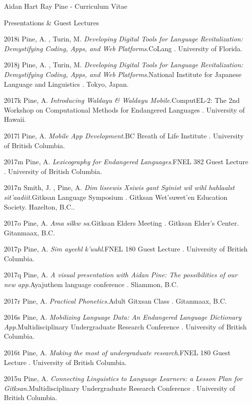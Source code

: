 \documentclass[12pt]{letter}
\begin{document}
\begin{cv}{ Aidan Hart Ray Pine  \space - \space   Curriculum Vitae}
\begin{cvlist}{Presentations \& Guest Lectures}
                    \item[2018i]  Pine,  A. ,  Turin,  M.   \textit{Developing Digital Tools for Language Revitalization: Demystifying Coding, Apps, and Web Platforms}.CoLang . University of Florida.  
                    \item[2018j]  Pine,  A. ,  Turin,  M.   \textit{Developing Digital Tools for Language Revitalization: Demystifying Coding, Apps, and Web Platforms}.National Institute for Japanese Language and Linguistics . Tokyo, Japan.  
                    \item[2017k]  Pine,  A.   \textit{Introducing Waldayu \& Waldayu Mobile}.ComputEL-2: The 2nd Workshop on Computational Methods for Endangered Languages . University of Hawaii.  
                    \item[2017l]  Pine,  A.   \textit{Mobile App Development}.BC Breath of Life Institute . University of British Columbia.  
                    \item[2017m]  Pine,  A.   \textit{Lexicography for Endangered Languages}.FNEL 382 Guest Lecture . University of British Columbia.  
                    \item[2017n]  Smith,  J. ,  Pine,  A.   \textit{Dim liseewis Xsiwis gant Sginist wil wihl hahlaalst sit'aadiit}.Gitksan Language Symposium . Gitksan Wet'suwet'en Education Society. Hazelton, B.C..  
                    \item[2017o]  Pine,  A.   \textit{Ama silkw sa}.Gitksan Elders Meeting . Gitksan Elder's Center. Gitanmaax, B.C.  
                    \item[2017p]  Pine,  A.   \textit{Sim ayeehl k'uuhl}.FNEL 180 Guest Lecture . University of British Columbia.  
                    \item[2017q]  Pine,  A.   \textit{A visual presentation with Aidan Pine: The possibilities of our new app}.Ayajuthem language conference . Sliammon, B.C.  
                    \item[2017r]  Pine,  A.   \textit{Practical Phonetics}.Adult Gitxsan Class . Gitanmaax, B.C.  
                    \item[2016s]  Pine,  A.   \textit{Mobilizing Language Data: An Endangered Language Dictionary App}.Multidisciplinary Undergraduate Research Conference . University of British Columbia.  
                    \item[2016t]  Pine,  A.   \textit{Making the most of undergraduate research}.FNEL 180 Guest Lecture . University of British Columbia.  
                    \item[2015u]  Pine,  A.   \textit{Connecting Linguistics to Language Learners: a Lesson Plan for Gitksan}.Multidisciplinary Undergraduate Research Conference . University of British Columbia.  

\end{cvlist}
\end{cv}
\end{document}

